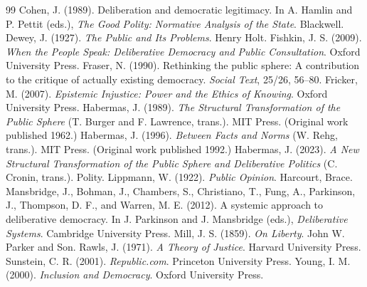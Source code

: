 \documentclass{situationist-preprint}
\begin{document}
\begin{thebibliography}{99}\small
{} Cohen, J. (1989). Deliberation and democratic legitimacy. In A. Hamlin and P. Pettit (eds.), \emph{The Good Polity: Normative Analysis of the State}. Blackwell.
 Dewey, J. (1927). \emph{The Public and Its Problems}. Henry Holt.
 Fishkin, J. S. (2009). \emph{When the People Speak: Deliberative Democracy and Public Consultation}. Oxford University Press.
 Fraser, N. (1990). Rethinking the public sphere: A contribution to the critique of actually existing democracy. \emph{Social Text}, 25/26, 56--80.
 Fricker, M. (2007). \emph{Epistemic Injustice: Power and the Ethics of Knowing}. Oxford University Press.
 Habermas, J. (1989). \emph{The Structural Transformation of the Public Sphere} (T. Burger and F. Lawrence, trans.). MIT Press. (Original work published 1962.)
 Habermas, J. (1996). \emph{Between Facts and Norms} (W. Rehg, trans.). MIT Press. (Original work published 1992.)
 Habermas, J. (2023). \emph{A New Structural Transformation of the Public Sphere and Deliberative Politics} (C. Cronin, trans.). Polity.
 Lippmann, W. (1922). \emph{Public Opinion}. Harcourt, Brace.
 Mansbridge, J., Bohman, J., Chambers, S., Christiano, T., Fung, A., Parkinson, J., Thompson, D. F., and Warren, M. E. (2012). A systemic approach to deliberative democracy. In J. Parkinson and J. Mansbridge (eds.), \emph{Deliberative Systems}. Cambridge University Press.
 Mill, J. S. (1859). \emph{On Liberty}. John W. Parker and Son.
 Rawls, J. (1971). \emph{A Theory of Justice}. Harvard University Press.
 Sunstein, C. R. (2001). \emph{Republic.com}. Princeton University Press.
 Young, I. M. (2000). \emph{Inclusion and Democracy}. Oxford University Press.
\end{thebibliography}
\end{document}
